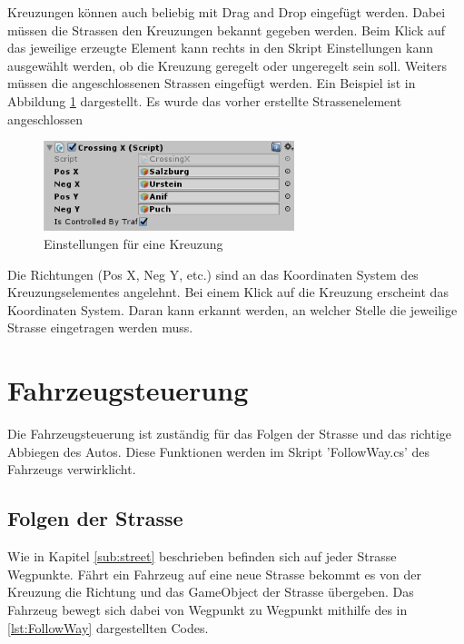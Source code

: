 Kreuzungen können auch beliebig mit Drag and Drop eingefügt werden. Dabei müssen die Strassen den Kreuzungen bekannt gegeben werden. Beim Klick auf das jeweilige erzeugte Element kann rechts in den Skript Einstellungen kann ausgewählt werden, ob die Kreuzung geregelt oder ungeregelt sein soll.
Weiters müssen die angeschlossenen Strassen eingefügt werden. Ein Beispiel ist in Abbildung \ref{img:crossbuild} dargestellt. Es wurde das vorher erstellte Strassenelement angeschlossen 

\begin{figure}[H]
\begin{center}
	\includegraphics[width=0.65\textwidth]{BilderAllgemein/crossingImpl.PNG}
\end{center}
	\caption{Einstellungen für eine Kreuzung}
	\label{img:crossbuild}
\end{figure}

Die Richtungen (Pos X, Neg Y, etc.) sind an das Koordinaten System des Kreuzungselementes angelehnt. Bei einem Klick auf die Kreuzung erscheint das Koordinaten System. Daran kann erkannt werden, an welcher Stelle die jeweilige Strasse eingetragen werden muss.

\section{Fahrzeugsteuerung}
\label{Fahrzeugsteuerung}

Die Fahrzeugsteuerung ist zuständig für das Folgen der Strasse und das richtige Abbiegen des Autos. Diese Funktionen werden im Skript 'FollowWay.cs' des Fahrzeugs verwirklicht.

\subsection{Folgen der Strasse}
Wie in Kapitel \ref{sub:street} beschrieben befinden sich auf jeder Strasse Wegpunkte. Fährt ein Fahrzeug auf eine neue Strasse bekommt es von der Kreuzung die Richtung und das GameObject der Strasse übergeben. Das Fahrzeug bewegt sich dabei von Wegpunkt zu Wegpunkt mithilfe des in \ref{lst:FollowWay} dargestellten Codes.

